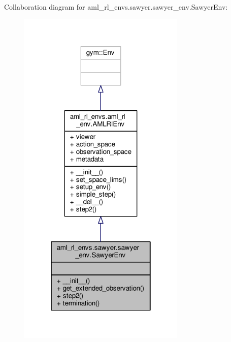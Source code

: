 Collaboration diagram for aml\-\_\-rl\-\_\-envs.\-sawyer.\-sawyer\-\_\-env.\-Sawyer\-Env\-:
\nopagebreak
\begin{figure}[H]
\begin{center}
\leavevmode
\includegraphics[width=226pt]{classaml__rl__envs_1_1sawyer_1_1sawyer__env_1_1_sawyer_env__coll__graph}
\end{center}
\end{figure}
